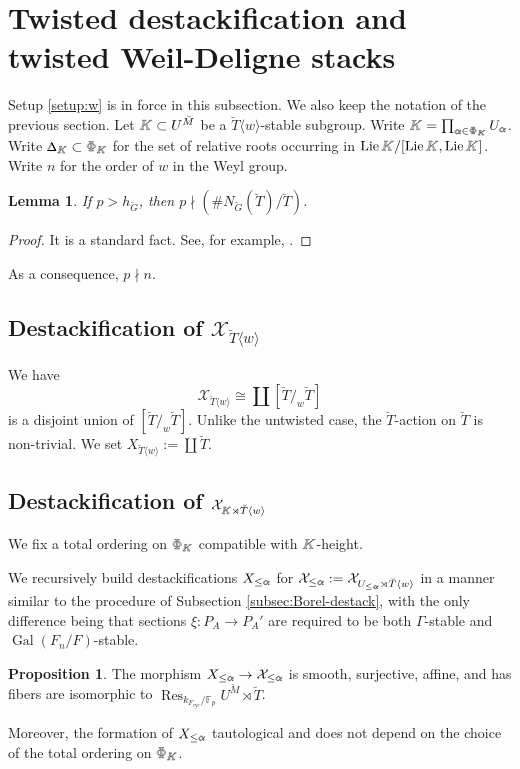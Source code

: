 \documentclass[11pt]{amsart}
\newcommand{\MINOREDITED}[1]{#1}
\newtheorem{lem}[thm]{Lemma}
\theoremstyle{definition}
\newtheorem{prop}[thm]{Proposition}
\newcommand{\doublestroke}[1]{\pdfliteral{1 Tr .3 w}#1\pdfliteral{0 Tr 0 w}}
\newcommand{\BPhi}{\doublestroke{\Phi}}
\newcommand{\BK}{\doublestroke{K}}
\newcommand{\Balpha}{\doublestroke{\alpha}}
\newcommand{\BDelta}{%
    \scalebox{.8}{$\Delta$}%
    \llap{%
            \scalebox{.9}{$\Delta$}%
    }%
}
\newcommand{\F}{\mathbb{F}}
\newcommand{\cX}{\mathcal{X}}
\newcommand{\bG}{\breve{G}}
\newcommand{\bM}{\breve{M}}
\newcommand{\bT}{\breve{T}}
\newcommand{\cyc}{{\operatorname{cyc}}}
\DeclareMathOperator{\Lie}{Lie}
\DeclareMathOperator{\Gal}{Gal}
\DeclareMathOperator{\Res}{Res}
\begin{document}
\section{Twisted destackification and twisted
Weil-Deligne stacks}

Setup \ref{setup:w} is in force in this subsection.
We also keep the notation of the previous section.
Let $\BK\subset U^{\bM}$
\MINOREDITED{be} a $\bT\langle w\rangle$-stable
subgroup.
Write $\BK=\prod_{\Balpha\in \BPhi_{\BK}}U_{\Balpha}$.
Write $\BDelta_{\BK}\subset \BPhi_{\BK}$
for the set of relative roots \MINOREDITED{occurring}
in $\Lie \BK/[\Lie\BK, \Lie\BK]$.
Write $n$ for the order of $w$ in the Weyl group.

\begin{lem}
If $p>h_{\bG}$, then $p\nmid (\#N_{\bG}(\bT)/\bT)$.
\end{lem}

\begin{proof}
It is a standard fact.
See, for example, 
\cite[Theorem 3.9]{Hum90}.
\end{proof}

As a consequence, $p\nmid n$.

\subsection{Destackification of
$\cX_{\bT \langle w\rangle}$}

We have
\[
{\cX_{\bT \langle w\rangle}}
\cong
\coprod [\bT/_w\bT]
\]
is a disjoint union of $[\bT/_w\bT]$.
Unlike the untwisted case,
the $\bT$-action on $\bT$ is non-trivial.
We set $X_{\bT \langle w\rangle}
:=\coprod \bT$.

\subsection{Destackification of $\cX_{\BK\rtimes \bT \langle w\rangle}$}
We fix a total ordering
on $\BPhi_{\BK}$ compatible with $\BK$-height.

We recursively build destackifications $X_{\le \Balpha}$
for $\cX_{\le \Balpha}:=\cX_{U_{\le \Balpha}
\rtimes \bT \langle w\rangle}$
in a manner similar to the procedure
of Subsection \ref{subsec:Borel-destack},
with the only difference being that sections
$\xi:P_A\to P_A'$ are required to be both $\Gamma$-stable
and $\Gal(F_n/F)$-stable.

\begin{prop}
The morphism
$X_{\le \Balpha}\to \cX_{\le \Balpha}$ is smooth, surjective,
affine, and \MINOREDITED{has fibers}
are isomorphic to $\Res_{k_{F_{\cyc}}/\F_p}U^{\bM}\rtimes \bT$.

Moreover, the formation of $X_{\le \Balpha}$
tautological and does not depend
on the choice of the total ordering on $\BPhi_{\BK}$.
\end{prop}
\end{document}
